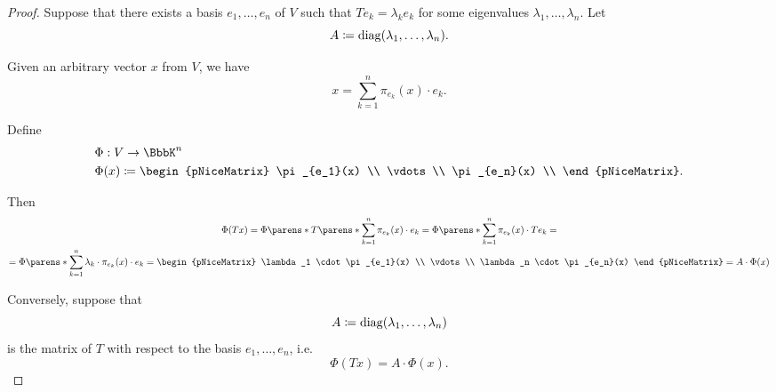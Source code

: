 \begin{proof}
   Suppose that there exists a basis \( e_1, \ldots, e_n \) of \( V \) such that \( T e_k = \lambda_k e_k \) for some eigenvalues \( \lambda_1, \ldots, \lambda_n \). Let
  \begin{equation*}
    A \coloneqq \op{diag}(\lambda_1, \ldots, \lambda_n).
  \end{equation*}

  Given an arbitrary vector \( x \) from \( V \), we have
  \begin{equation*}
    x = \sum_{k=1}^n \pi_{e_k}(x) \cdot e_k.
  \end{equation*}

  Define
  \begin{equation*}
    \begin{aligned}
      &\Phi: V \to \BbbK^n \\
      &\Phi(x) \coloneqq \begin{pNiceMatrix}
        \pi_{e_1}(x) \\
        \vdots \\
        \pi_{e_n}(x) \\
      \end{pNiceMatrix}.
    \end{aligned}
  \end{equation*}

  Then
  \begin{multline*}
    \Phi(T x)
    =
    \Phi\parens*{ T \parens*{ \sum_{k=1}^n \pi_{e_k}(x) \cdot e_k } }
    =
    \Phi\parens*{ \sum_{k=1}^n \pi_{e_k}(x) \cdot T e_k }
    = \\ =
    \Phi\parens*{ \sum_{k=1}^n \lambda_k \cdot \pi_{e_k}(x) \cdot e_k }
    =
    \begin{pNiceMatrix}
      \lambda_1 \cdot \pi_{e_1}(x) \\
      \vdots \\
      \lambda_n \cdot \pi_{e_n}(x)
    \end{pNiceMatrix}
    =
    A \cdot \Phi(x)
  \end{multline*}

   Conversely, suppose that
  \begin{equation*}
    A \coloneqq \op{diag}(\lambda_1, \ldots, \lambda_n)
  \end{equation*}
  is the matrix of \( T \) with respect to the basis \( e_1, \ldots, e_n \), i.e.
  \begin{equation*}
    \Phi(T x) = A \cdot \Phi(x).
  \end{equation*}


\end{proof}
